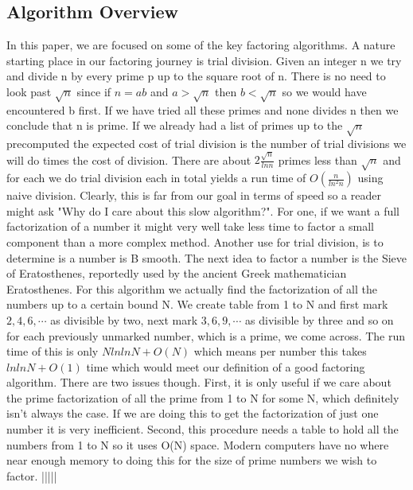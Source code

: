 \documentclass{article}
\begin{document}
\subsection{Algorithm Overview}
In this paper, we are focused on some of the key factoring algorithms. A nature starting place in our factoring journey is trial division. Given an integer n we try and divide n by every prime p up to the square root of n. There is no need to look past $\sqrt{n}$ since if $n = ab$ and $a > \sqrt{n}$ then $b < \sqrt{n}$ so we would have encountered b first. If we have tried all these primes and none divides n then we conclude that n is prime. If we already had a list of primes up to the $\sqrt{n}$ precomputed the expected cost of trial division is the number of trial divisions we will do times the cost of division. There are about $ 2 \frac{\sqrt{n}}{ln n}$ primes less than $\sqrt{n}$ and for each we do trial division each in total yields a run time of $O(\frac{n}{ln^2 n})$ using naive division. Clearly, this is far from our goal in terms of speed so a reader might ask "Why do I care about this slow algorithm?". For one, if we want a full factorization of a number it might very well take less time to factor a small component than a more complex method. Another use for trial division, is to determine is a number is B smooth. 
The next idea to factor a number is the Sieve of Eratosthenes, reportedly used by the ancient Greek mathematician Eratosthenes. For this algorithm we actually find the factorization of all the numbers up to a certain bound N. We create table from 1 to N and first mark $2, 4, 6, \cdots $ as divisible by two, next mark $3, 6, 9, \cdots$ as divisible by three and so on for each previously unmarked number, which is a prime,  we come across. The run time of this is only $N ln ln N +  O(N)$ which means per number this takes $ln ln N + O ( 1 )$ time which would meet our definition of a good factoring algorithm. There are two issues though. First, it is only useful if we care about the prime factorization of all the prime from 1 to N for some N, which definitely isn't always the case. If we are doing this to get the factorization of just one number it is very inefficient. Second, this procedure needs a table to hold all the numbers from 1 to N so it uses O(N) space. Modern computers have no where near enough memory to doing this for the size of prime numbers we wish to factor. 
|||||
\end{document}
